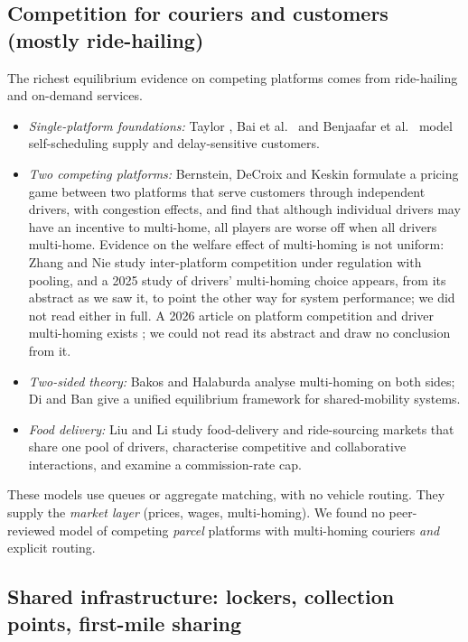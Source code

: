 \documentclass[preprint,12pt]{elsarticle}
\begin{document}
\subsection{Competition for couriers and customers (mostly ride-hailing)}

The richest equilibrium evidence on competing platforms comes from ride-hailing and on-demand services.
\begin{itemize}[leftmargin=*]
\item \emph{Single-platform foundations:} Taylor \cite{Taylor2018}, Bai et al.\ \cite{Bai2019} and Benjaafar et al.\ \cite{Benjaafar2022} model self-scheduling supply and delay-sensitive customers.
\item \emph{Two competing platforms:} Bernstein, DeCroix and Keskin \cite{Bernstein2021} formulate a pricing game between two platforms that serve customers through independent drivers, with congestion effects, and find that although individual drivers may have an incentive to multi-home, all players are worse off when all drivers multi-home. Evidence on the welfare effect of multi-homing is not uniform: Zhang and Nie \cite{ZhangNie2021} study inter-platform competition under regulation with pooling, and a 2025 study of drivers' multi-homing choice \cite{Gao2025tre} appears, from its abstract as we saw it, to point the other way for system performance; we did not read either in full. A 2026 article on platform competition and driver multi-homing exists \cite{Zhou2026}; we could not read its abstract and draw no conclusion from it.
\item \emph{Two-sided theory:} Bakos and Halaburda \cite{BakosHalaburda2020} analyse multi-homing on both sides; Di and Ban \cite{DiBan2019} give a unified equilibrium framework for shared-mobility systems.
\item \emph{Food delivery:} Liu and Li \cite{LiuLi2023} study food-delivery and ride-sourcing markets that share one pool of drivers, characterise competitive and collaborative interactions, and examine a commission-rate cap.
\end{itemize}
These models use queues or aggregate matching, with no vehicle routing. They supply the \emph{market layer} (prices, wages, multi-homing). We found no peer-reviewed model of competing \emph{parcel} platforms with multi-homing couriers \emph{and} explicit routing.

\subsection{Shared infrastructure: lockers, collection points, first-mile sharing}
\end{document}
